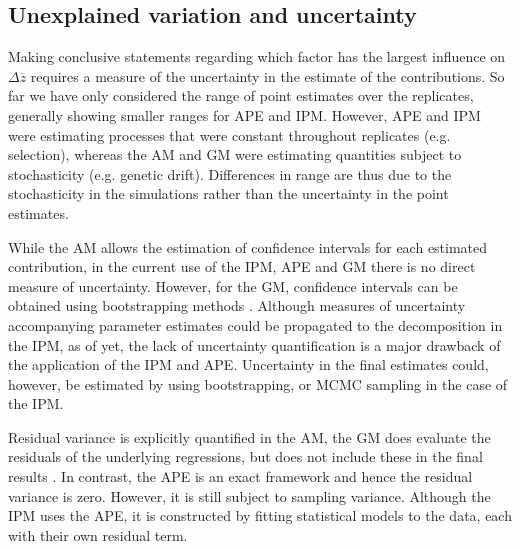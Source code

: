 \subsection*{Unexplained variation and uncertainty}
Making conclusive statements regarding which factor has the largest influence on $\Delta \overline z$ requires a measure of the uncertainty in the estimate of the contributions. So far we have only considered the range of point estimates over the replicates, generally showing smaller ranges for APE and IPM. However, APE and IPM were estimating processes that were constant throughout replicates (e.g. selection), whereas the AM and GM were estimating quantities subject to stochasticity (e.g. genetic drift). Differences in range are thus due to the stochasticity in the simulations rather than the uncertainty in the point estimates.

While the AM allows the estimation of confidence intervals for each estimated contribution, in the current use of the IPM, APE and GM there is no direct measure of uncertainty. However, for the GM, confidence intervals can be obtained using bootstrapping methods \parencite[as in][]{Ellner2011}. Although measures of uncertainty accompanying parameter estimates could be propagated to the decomposition in the IPM, as of yet, the lack of uncertainty quantification is a major drawback of the application of the IPM and APE. Uncertainty in the final estimates could, however, be estimated by using bootstrapping, or MCMC sampling in the case of the IPM.

Residual variance is explicitly quantified in the AM, the GM does evaluate the residuals of the underlying regressions, but does not include these in the final results \parencite{Ellner2011}. In contrast, the APE is an exact framework and hence the residual variance is zero. However, it is still subject to sampling variance. Although the IPM uses the APE, it is constructed by fitting statistical models to the data, each with their own residual term. 

